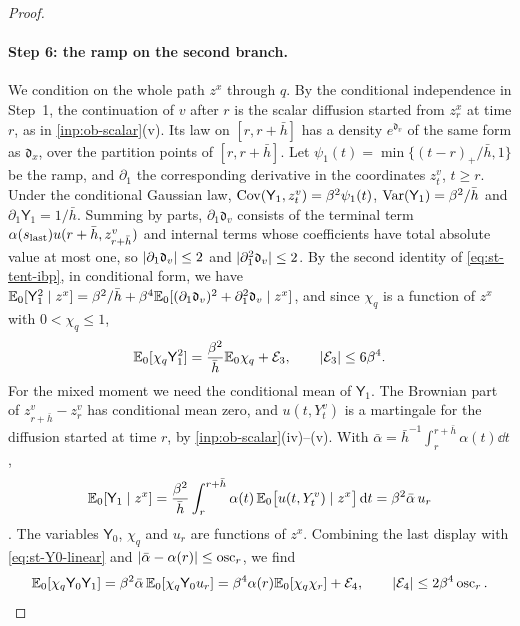 \begin{proof}
\paragraph{Step 6: the ramp on the second branch.} We condition on the whole path $z^x$ through $q$. By the conditional independence in Step~1, the continuation of $v$ after $r$ is the scalar diffusion started from $z^x_r$ at time $r$, as in \cref{inp:ob-scalar}(v). Its law on $[r,r+\bar h]$ has a density $e^{\mathfrak d_v}$ of the same form as $\mathfrak d_x$, over the partition points of $[r,r+\bar h]$. Let $\psi_1(t)=\min\{(t-r)_+/\bar h,1\}$ be the ramp, and $\partial_1$ the corresponding derivative in the coordinates $z^v_t$, $t\ge r$. Under the conditional Gaussian law, $\operatorname{Cov}(\mathsf Y_1,z^v_t)=\beta^2\psi_1(t)$, $\operatorname{Var}(\mathsf Y_1)=\beta^2/\bar h$ and $\partial_1\mathsf Y_1=1/\bar h$. Summing by parts, $\partial_1\mathfrak d_v$ consists of the terminal term $\alpha(s_{\rm last})u(r+\bar h,z^v_{r+\bar h})$ and internal terms whose coefficients have total absolute value at most one, so $\lvert \partial_1\mathfrak d_v\rvert\le2$ and $\lvert \partial_1^2\mathfrak d_v\rvert\le2$. By the second identity of \eqref{eq:st-tent-ibp}, in conditional form, we have $\mathbb E_0[\mathsf Y_1^2\mid z^x]=\beta^2/\bar h+\beta^4\mathbb E_0[(\partial_1\mathfrak d_v)^2+\partial_1^2\mathfrak d_v\mid z^x]$, and since $\chi_q$ is a function of $z^x$ with $0<\chi_q\le1$,
\begin{equation}\label{eq:st-Y1-square}
 \mathbb E_0[\chi_q\mathsf Y_1^2]=\frac{\beta^2}{\bar h}\mathbb E_0\chi_q+\mathcal E_3,\qquad\lvert \mathcal E_3\rvert\le6\beta^4.
\end{equation}
For the mixed moment we need the conditional mean of $\mathsf Y_1$. The Brownian part of $z^v_{r+\bar h}-z^v_r$ has conditional mean zero, and $u(t,Y^v_t)$ is a martingale for the diffusion started at time $r$, by \cref{inp:ob-scalar}(iv)--(v). With $\bar\alpha=\bar h^{-1}\int_r^{r+\bar h}\alpha(t)\dd t$,
\[
 \mathbb E_0[\mathsf Y_1\mid z^x]=\frac{\beta^2}{\bar h}\int_r^{r+\bar h}\alpha(t)\,\mathbb E_0\bigl[u(t,Y^v_t)\mid z^x\bigr]\,\mathrm d t=\beta^2\bar\alpha\,u_r
\]
\cite[(7.27)]{oai-barriers}. The variables $\mathsf Y_0$, $\chi_q$ and $u_r$ are functions of $z^x$. Combining the last display with \eqref{eq:st-Y0-linear} and $\lvert \bar\alpha-\alpha(r)\rvert\le\operatorname{osc}_r$, we find
\begin{equation}\label{eq:st-mixed}
 \mathbb E_0[\chi_q\mathsf Y_0\mathsf Y_1]=\beta^2\bar\alpha\,\mathbb E_0[\chi_q\mathsf Y_0u_r]=\beta^4\alpha(r)\mathbb E_0[\chi_q\chi_r]+\mathcal E_4,\qquad\lvert \mathcal E_4\rvert\le2\beta^4\operatorname{osc}_r.
\end{equation}

\end{proof}
